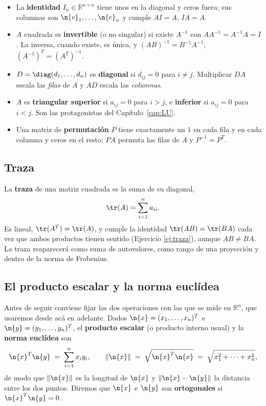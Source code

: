 \begin{itemize}[itemsep=2pt]
\item La \textbf{identidad} $I_n\in\mathbb{R}^{n\times n}$ tiene unos en la
diagonal y ceros fuera; sus columnas son $\n{e}_1,\dots,\n{e}_n$ y cumple
$AI = A$, $IA = A$.
\item $A$ cuadrada es \textbf{invertible} (o no singular) si existe $A^{-1}$ con
$AA^{-1} = A^{-1}A = I$. La inversa, cuando existe, es única, y
$(AB)^{-1} = B^{-1}A^{-1}$, $(A^{-1})^T = (A^T)^{-1}$.
\item $D = \diag(d_1,\dots,d_n)$ es \textbf{diagonal} si $d_{ij} = 0$ para
$i \neq j$. Multiplicar $DA$ escala las \emph{filas} de $A$ y $AD$ escala las
\emph{columnas}.
\item $A$ es \textbf{triangular superior} si $a_{ij} = 0$ para $i > j$, e
\textbf{inferior} si $a_{ij} = 0$ para $i < j$. Son las protagonistas del
Capítulo~\ref{cap:LU}.
\item Una matriz de \textbf{permutación} $P$ tiene exactamente un $1$ en cada
fila y en cada columna y ceros en el resto; $PA$ permuta las filas de $A$ y
$P^{-1} = P^T$.
\end{itemize}

\subsection{Traza}

La \textbf{traza} de una matriz cuadrada es la suma de su diagonal,
\[
\tr(A) = \sum_{i=1}^n a_{ii}.
\]
Es lineal, $\tr(A^T) = \tr(A)$, y cumple la identidad
$\tr(AB) = \tr(BA)$ cada vez que ambos productos tienen sentido (Ejercicio
\ref{ej:traza}), aunque $AB \neq BA$. La traza reaparecerá como suma de
autovalores, como rango de una proyección y dentro de la norma de Frobenius.

\subsection{El producto escalar y la norma euclídea}
\label{sec:producto-escalar}

Antes de seguir conviene fijar las dos operaciones con las que se mide en
$\mathbb{R}^n$, que usaremos desde acá en adelante. Dados
$\n{x}=(x_1,\dots,x_n)^T$ e $\n{y}=(y_1,\dots,y_n)^T$, el \textbf{producto
escalar} (o producto interno usual) y la \textbf{norma euclídea} son
\[
\n{x}^T\n{y} \;=\; \sum_{i=1}^n x_iy_i ,
\qquad
\|\n{x}\| \;=\; \sqrt{\n{x}^T\n{x}} \;=\; \sqrt{x_1^2+\cdots+x_n^2} ,
\]
de modo que $\|\n{x}\|$ es la longitud de $\n{x}$ y $\|\n{x}-\n{y}\|$ la
distancia entre los dos puntos. Diremos que $\n{x}$ e $\n{y}$ son
\textbf{ortogonales} si $\n{x}^T\n{y}=0$.

